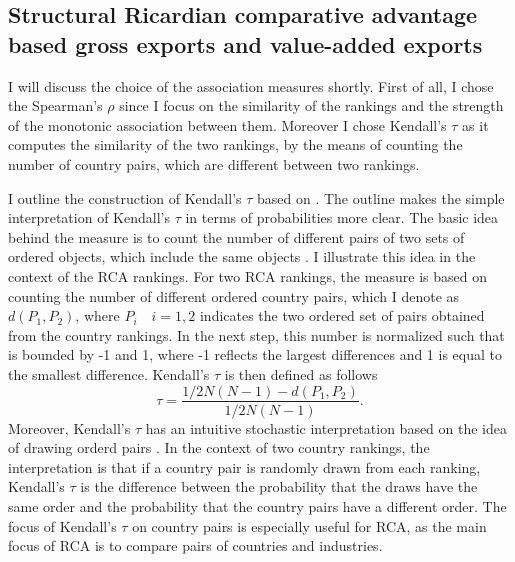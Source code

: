 \subsection{Structural Ricardian comparative advantage based gross exports and value-added exports}
I will discuss the choice of the association measures shortly.
First of all, I chose the Spearman's $\rho$  since I focus on the similarity of the rankings and the strength of the monotonic association between them.
Moreover I chose Kendall's $\tau$ as it computes the similarity of the two rankings, by the means of counting the number of country pairs, which are different between two rankings.%
\par
I outline the construction of Kendall's $\tau$ based on \textcite{abdi2007kendall}.
The outline makes the simple interpretation of Kendall's $\tau$ in terms of probabilities more clear.
The basic idea behind the measure is to count the number of different pairs of two sets of ordered  objects, which include the same objects  \textcite{abdi2007kendall}.
I illustrate this idea in the context of the RCA rankings.
For two RCA rankings, the measure is based on counting the number of different ordered country pairs, which I denote as $d(P_1, P_2)$, where $P_i \quad i=1,2$ indicates the two ordered set of pairs obtained from the country rankings.
In the next step, this number is normalized such that is bounded by -1 and 1, where -1 reflects the largest differences and 1 is equal to the smallest difference.
Kendall's $\tau$ is then defined as follows \[ \tau= \frac{1/2 N(N-1) - d(P_1,P_2)} {1/2 N(N-1)} .\] %
Moreover, Kendall's $\tau$ has an intuitive stochastic interpretation based on the idea of drawing orderd pairs \parencite{abdi2007kendall}.
In the context of two country rankings, the interpretation is that if a country pair is randomly drawn from each ranking, Kendall's $\tau$ is the difference between the probability that the draws have the same order and the probability that the country pairs have a different order.
The focus of Kendall's $\tau$ on country pairs is especially useful for RCA, as the main focus of RCA is to compare pairs of countries and industries.   \par
